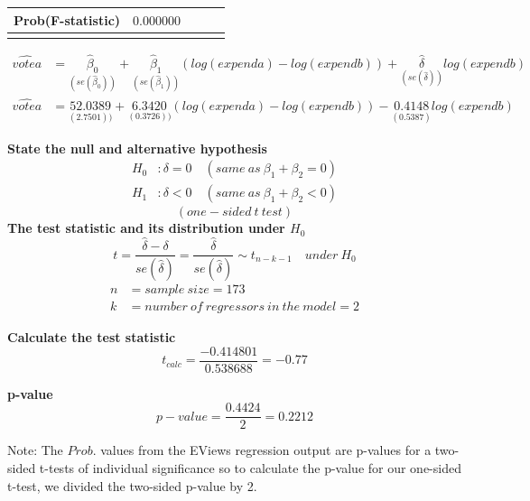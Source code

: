 \documentclass[12pt]{report}
\begin{document}
\begin{table}[H]
\begin{tabular}{lrrrr}
		\multicolumn{1}{l}{Prob(F-statistic)}&\multicolumn{1}{r}{$0.000000$}&\multicolumn{1}{c}{}&\multicolumn{1}{c}{}&\multicolumn{1}{c}{}\\
		[4.5pt] \hline \\ [-4.5pt]
	\end{tabular}
\end{table} \begin{align*}
	\widehat{votea} &= \underset{(se(\hat{\beta}_0))}{\hat{\beta}_0} + \underset{(se(\hat{\beta}_1))}{\hat{\beta}_1}(log(expenda)-log(expendb)) + \underset{(se(\hat{\delta}))}{\hat{\delta}}log(expendb) \\ 
	\widehat{votea} &= \underset{(2.7501))}{52.0389} + \underset{(0.3726))}{6.3420}(log(expenda)-log(expendb)) - \underset{(0.5387)}{0.4148}log(expendb)
\end{align*}

\noindent \textbf{State the null and alternative hypothesis}
\begin{align*}
H_0&: \delta = 0 \quad (same\ as\ \beta_1 + \beta_2 = 0) \\
H_1&: \delta < 0 \quad (same\ as\ \beta_1 + \beta_2 < 0)
\end{align*}
$$(one-sided\ t\ test)$$
\noindent \textbf{The test statistic and its distribution under $H_0$}
$$t = \dfrac{\hat{\delta} - \delta}{se(\hat{\delta})} = \dfrac{\hat{\delta}}{se(\hat{\delta})} \sim t_{n-k-1} \quad under\ H_0$$
\begin{align*}
n &= sample\ size = 173 \\
k &= number\ of\ regressors\ in\ the\ model = 2
\end{align*}

\noindent \textbf{Calculate the test statistic}
$$t_{calc} = \dfrac{-0.414801}{0.538688} = -0.77$$


\noindent \textbf{p-value}
$$p-value = \dfrac{0.4424}{2} = 0.2212$$

\noindent Note: The $Prob.$ values from the EViews regression output are p-values for a two-sided t-tests of individual significance so to calculate the p-value for our one-sided t-test, we divided the two-sided p-value by 2.
\end{document}
